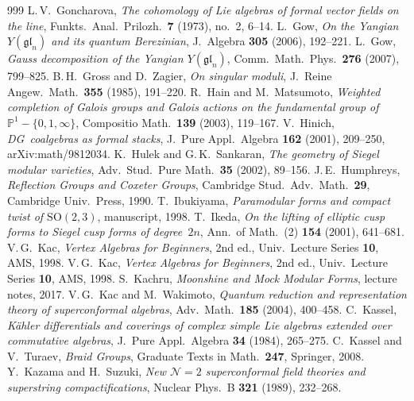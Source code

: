 \begin{thebibliography}{999}
 L.\,V.~Goncharova, \emph{The cohomology of Lie algebras of formal vector fields on the line}, Funkts.\ Anal.\ Prilozh.\ \textbf{7} (1973), no.~2, 6--14.
 L.~Gow, \emph{On the Yangian $Y(\mathfrak{gl}_n)$ and its quantum Berezinian}, J.~Algebra \textbf{305} (2006), 192--221.
 L.~Gow, \emph{Gauss decomposition of the Yangian $Y(\mathfrak{gl}_n)$}, Comm.\ Math.\ Phys.\ \textbf{276} (2007), 799--825.
 B.\,H.~Gross and D.~Zagier, \emph{On singular moduli}, J.~Reine Angew.\ Math.\ \textbf{355} (1985), 191--220.
 R.~Hain and M.~Matsumoto, \emph{Weighted completion of Galois groups and Galois actions on the fundamental group of $\mathbb{P}^1 - \{0, 1, \infty\}$}, Compositio Math.\ \textbf{139} (2003), 119--167.
 V.~Hinich, \emph{DG~coalgebras as formal stacks}, J.~Pure Appl.\ Algebra \textbf{162} (2001), 209--250, arXiv:math/9812034.
 K.~Hulek and G.\,K.~Sankaran, \emph{The geometry of Siegel modular varieties}, Adv.\ Stud.\ Pure Math.\ \textbf{35} (2002), 89--156.
 J.\,E.~Humphreys, \emph{Reflection Groups and Coxeter Groups}, Cambridge Stud.\ Adv.\ Math.\ \textbf{29}, Cambridge Univ.\ Press, 1990.
 T.~Ibukiyama, \emph{Paramodular forms and compact twist of $\mathrm{SO}(2,3)$}, manuscript, 1998.
 T.~Ikeda, \emph{On the lifting of elliptic cusp forms to Siegel cusp forms of degree~$2n$}, Ann.\ of Math.\ (2) \textbf{154} (2001), 641--681.
 V.\,G.~Kac, \emph{Vertex Algebras for Beginners}, 2nd ed., Univ.\ Lecture Series \textbf{10}, AMS, 1998.
 V.\,G.~Kac, \emph{Vertex Algebras for Beginners}, 2nd ed., Univ.\ Lecture Series \textbf{10}, AMS, 1998.
 S.~Kachru, \emph{Moonshine and Mock Modular Forms}, lecture notes, 2017.
 V.\,G.~Kac and M.~Wakimoto, \emph{Quantum reduction and representation theory of superconformal algebras}, Adv.\ Math.\ \textbf{185} (2004), 400--458.
 C.~Kassel, \emph{K\"ahler differentials and coverings of complex simple Lie algebras extended over commutative algebras}, J.~Pure Appl.\ Algebra \textbf{34} (1984), 265--275.
 C.~Kassel and V.~Turaev, \emph{Braid Groups}, Graduate Texts in Math.\ \textbf{247}, Springer, 2008.
 Y.~Kazama and H.~Suzuki, \emph{New $\mathcal N=2$ superconformal field theories and superstring compactifications}, Nuclear Phys.\ B \textbf{321} (1989), 232--268.

\end{thebibliography}

